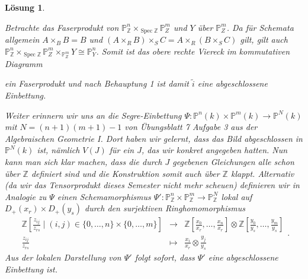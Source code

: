 \documentclass[paper = A4, fontsize=12pt, numbers=noendperiod, chapterprefix=true]{scrbook}
\theoremstyle{break}
\newtheorem{Loes}{L\"osung}
\theoremstyle{nonumberbreak}
\theoremstyle{nonumberplain}
\DeclareMathOperator{\Spec}{Spec}
\newcommand{\Z}{\mathbb{Z}}
\newcommand{\IP}{\mathbb{P}}%
\begin{document}
\begin{Loes}
\begin{enumerate}[a)]
 Betrachte das Faserprodukt von $\IP^n_{\Z} \times_{\Spec \Z} \IP^m_Z$ und $Y$ über $\IP^m_Z$.
 Da für Schemata allgemein $A \times_B B = B$ und $(A \times_R B) \times_S C =  A \times_R (B \times_S C)$ gilt, gilt auch $\IP^n_{\Z} \times_{\Spec \Z} \IP^m_Z \times_{\IP^m_Z} Y \cong \IP^n_Y$. Somit ist das obere rechte Viereck im kommutativen Diagramm 
 
 \begin{minipage}{7.9cm}
 \centering
{}
\end{minipage}
\begin{minipage}{7cm}
  ein Faserprodukt und nach Behauptung 1 ist damit $\tilde{i}$ eine abgeschlossene Einbettung.
\end{minipage}

 Weiter erinnern wir uns an die Segre-Einbettung $\Psi \colon \IP^n(k) \times \IP^m(k) \to \IP^N(k)$ mit $N = (n+1)(m+1)-1$ von Übungsblatt 7 Aufgabe 3 aus der Algebraischen Geometrie I. Dort haben wir gelernt, dass das Bild abgeschlossen in $\IP^N(k)$ ist, nämlich $V(J)$ für ein $J$, das wir konkret angegeben hatten. 
 Nun kann man sich klar machen, dass die durch $J$ gegebenen Gleichungen alle schon über $\Z$ definiert sind und die Konstruktion somit auch über $\Z$ klappt. Alternativ (da wir das Tensorprodukt dieses Semester nicht mehr scheuen) definieren wir in Analogie zu $\Psi$ einen Schemamorphismus $\Psi' \colon \IP^n_{\Z} \times \IP^m_{\Z} \to \IP^N_{\Z}$ lokal auf $D_+(x_r) \times D_+(y_s)$ durch den surjektiven Ringhomomorphismus
 $$\begin{array}{ccc}
 \Z[\frac{z_{ij}} {z_{rs}} \mid (i,j) \in \{0,\dots,n\}\times \{0,\dots,m\}] & \longrightarrow & \Z[\frac{x_0}{x_r},\dots,\frac{x_n}{x_r}] \otimes \Z[\frac{y_0}{y_s},\dots,\frac{y_m}{y_s}] \\
 \frac{z_{ij}} {z_{rs}} & \mapsto & \frac{x_i}{x_r} \otimes \frac{y_j}{y_s}
 \end{array}.
 $$
Aus der lokalen Darstellung von $\Psi'$ folgt sofort, dass $\Psi'$ eine abgeschlossene Einbettung ist.


\end{enumerate}
\end{Loes}
\end{document}
